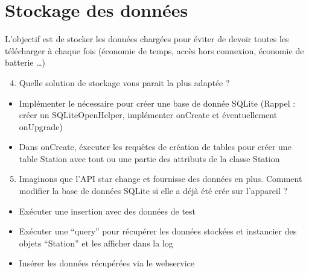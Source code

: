 \documentclass{article}
\begin{document}
\section{Stockage des données}
L'objectif est de stocker les données chargées pour éviter de devoir toutes les télécharger à chaque fois (économie de temps, accès hors connexion, économie de batterie \ldots)
\begin{enumerate}
 \setcounter{enumi}{3}
\item Quelle solution de stockage vous parait la plus adaptée ?
\end{enumerate}
\begin{itemize} 
  \item Implémenter le nécessaire pour créer une base de donnée SQLite (Rappel : créer un SQLiteOpenHelper, implémenter onCreate et éventuellement onUpgrade)
  \item Dans onCreate, éxecuter les requêtes de création de tables pour créer une table Station avec tout ou une partie des attributs de la classe Station
\end{itemize}
\begin{enumerate}
 \setcounter{enumi}{4}
\item Imaginons que l'API star change et fournisse des données en plus. Comment modifier la base de données SQLite si elle a déjà été crée sur l'appareil ?
\end{enumerate}
\begin{itemize} 
  \item Exécuter une insertion avec des données de test
  \item Exécuter une ``query'' pour récupérer les données stockées et instancier des objets ``Station'' et les afficher dans la log
  \item Insérer les données récupérées via le webservice
\end{itemize}
\end{document}
